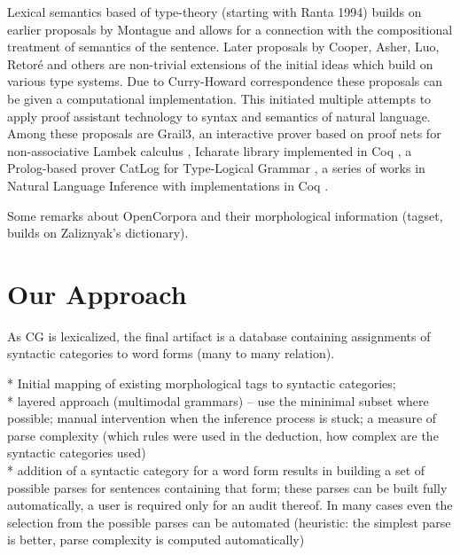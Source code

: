 \documentclass[a4paper]{article}
\theoremstyle{example-style}
\begin{document}
Lexical semantics based of type-theory (starting with Ranta 1994) builds on earlier proposals by Montague and allows for a connection with the compositional treatment of semantics of the sentence. Later proposals by Cooper, Asher, Luo, Retor\'{e} and others are non-trivial extensions of the initial ideas which build on various type systems. Due to Curry-Howard correspondence these proposals can be given a computational implementation. This initiated multiple attempts to apply proof assistant technology to syntax and semantics of natural language. Among these proposals are Grail3, an interactive prover based on proof nets for non-associative Lambek calculus \parencite{moot2002proof}, Icharate library implemented in Coq \parencite{anoun2007approche}, a Prolog-based prover CatLog for Type-Logical Grammar \parencite{morrill2012catlog}, a series of works in Natural Language Inference with implementations in Coq \parencite{chatzikyriakidis2014natural}.
 
Some remarks about OpenCorpora and their morphological information (tagset, builds on Zaliznyak's dictionary).


\section{Our Approach}

As CG is lexicalized, the final artifact is a database containing assignments of syntactic categories to word forms (many to many relation).

  * Initial mapping of existing morphological tags to syntactic categories; \\
  
  * layered approach (multimodal grammars) -- use the mininimal subset where possible; manual intervention when the inference process is stuck; a measure of parse complexity (which rules were used in the deduction, how complex are the syntactic categories used) \\
    
  * addition of a syntactic category for a word form results in building a set of possible parses for sentences containing that form; these parses can be built fully automatically, a user is required only for an audit thereof. In many cases even the selection from the possible parses can be automated (heuristic: the simplest parse is better, parse complexity is computed automatically) \\
  
\end{document}
